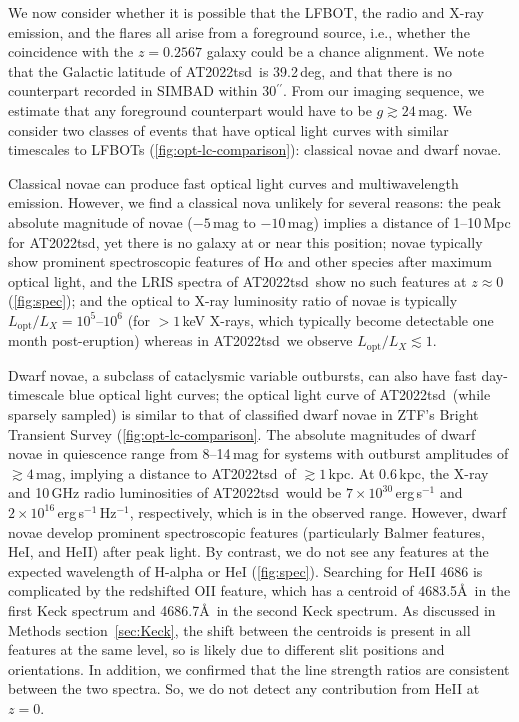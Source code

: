 \documentclass{nature_plusfigure}
\newcommand{\at}{AT2022tsd}
\begin{document}
\begin{methods}
We now consider whether it is possible that the LFBOT, the radio and X-ray emission, and the flares all arise from a foreground source, i.e., whether the coincidence with the $z=0.2567$ galaxy could be a chance alignment. 
We note that the Galactic latitude of \at\ is 39.2\,deg, and that there is no counterpart recorded in SIMBAD within 30$^{\prime\prime}$. From our imaging sequence, we estimate that any foreground counterpart would have to be $g \gtrsim 24\,$mag. We consider two classes of events that have optical light curves with similar timescales to LFBOTs (\ref{fig:opt-lc-comparison}): classical novae and dwarf novae.

Classical novae can produce fast optical light curves and multiwavelength emission\cite{Chomiuk2021}. However, we find a classical nova unlikely for several reasons: the peak absolute magnitude of novae ($-5\,$mag to $-10\,$mag\cite{Chomiuk2021}) implies a distance of 1--10\,Mpc for \at, yet there is no galaxy at or near this position; novae typically show prominent spectroscopic features of H$\alpha$ and other species after maximum optical light\cite{Chomiuk2021}, and the LRIS spectra of \at\ show no such features at $z\approx0$ (\ref{fig:spec}); and the optical to X-ray luminosity ratio of novae is typically $L_\mathrm{opt}/L_X=10^{5}$--$10^{6}$ (for $>1\,$keV X-rays, which typically become detectable one month post-eruption\cite{Chomiuk2021}) whereas in \at\ we observe $L_\mathrm{opt}/L_X\lesssim1$. 

Dwarf novae, a subclass of cataclysmic variable outbursts, can also have fast day-timescale blue optical light curves; the optical light curve of \at\ (while sparsely sampled) is similar to that of classified dwarf novae in ZTF's Bright Transient Survey\cite{PerleyBTS} (\ref{fig:opt-lc-comparison}. The absolute magnitudes of dwarf novae in quiescence range from 8--14\,mag for systems with outburst amplitudes of $\gtrsim4\,$mag\cite{Szkody2021}, implying a distance to \at\ of $\gtrsim1\,$kpc. At 0.6\,kpc, the X-ray and 10\,GHz radio luminosities of \at\ would be $7\times10^{30}\,$erg\,s$^{-1}$ and $2\times10^{16}$\,erg\,s$^{-1}$\,Hz$^{-1}$, respectively, which is in the observed range\cite{Polzin2022,Coppejans2020_CV}. 
However, dwarf novae develop prominent spectroscopic features (particularly Balmer features, HeI, and HeII) after peak light\cite{Morales-Rueda2002,Han2020}. By contrast, we do not see any features at the expected wavelength of H-alpha or HeI (\ref{fig:spec}). Searching for HeII 4686 is complicated by the redshifted OII feature, which has a centroid of 4683.5\AA\ in the first Keck spectrum and 4686.7\AA\ in the second Keck spectrum. 
As discussed in Methods section~\ref{sec:Keck}, the shift between the centroids is present in all features at the same level, so is likely due to different slit positions and orientations. In addition, we confirmed that the line strength ratios are consistent between the two spectra. So, we do not detect any contribution from HeII at $z=0$.


\end{methods}
\end{document}
